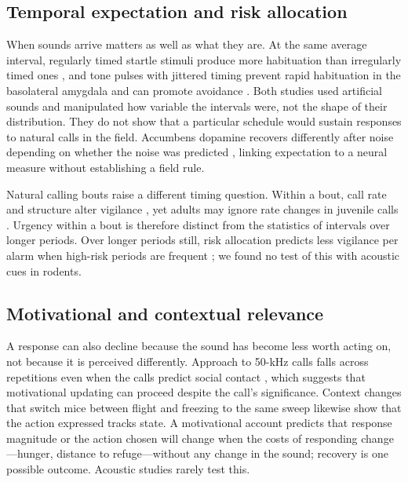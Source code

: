 \subsection{Temporal expectation and risk allocation}
\label{sec:persistence-timing}

When sounds arrive matters as well as what they are. At the same average interval, regularly timed startle stimuli produce more habituation than irregularly timed ones \citep{Davis1970}, and tone pulses with jittered timing prevent rapid habituation in the basolateral amygdala and can promote avoidance \citep{HerryEtAl2007}. Both studies used artificial sounds and manipulated how variable the intervals were, not the shape of their distribution. They do not show that a particular schedule would sustain responses to natural calls in the field. Accumbens dopamine recovers differently after noise depending on whether the noise was predicted \citep{GoedhoopEtAl2022}, linking expectation to a neural measure without establishing a field rule.

Natural calling bouts raise a different timing question. Within a bout, call rate and structure alter vigilance \citep{BlumsteinArmitage1997,SloanEtAl2005}, yet adults may ignore rate changes in juvenile calls \citep{SloanHare2006}.
Urgency within a bout is therefore distinct from the statistics of intervals over longer periods. Over longer periods still, risk allocation predicts less vigilance per alarm when high-risk periods are frequent \citep{LimaBednekoff1999}; we found no test of this with acoustic cues in rodents.

\subsection{Motivational and contextual relevance}
\label{sec:persistence-motivation}

A response can also decline because the sound has become less worth acting on, not because it is perceived differently. Approach to 50-kHz calls falls across repetitions even when the calls predict social contact \citep{BerzEtAl2022}, which suggests that motivational updating can proceed despite the call's significance. Context changes that switch mice between flight and freezing to the same sweep \citep{MongeauEtAl2003} likewise show that the action expressed tracks state. A motivational account predicts that response magnitude or the action chosen will change when the costs of responding change---hunger, distance to refuge---without any change in the sound; recovery is one possible outcome. Acoustic studies rarely test this.

